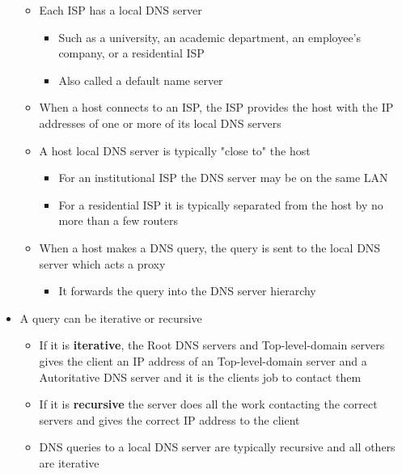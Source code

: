 \documentclass[11pt]{article}
\providecommand{\tightlist}{%
      \setlength{\itemsep}{0pt}\setlength{\parskip}{0pt}}
\begin{document}
\begin{itemize}
  \begin{itemize}
  \tightlist
  \item
    Each ISP has a local DNS server

    \begin{itemize}
    \tightlist
    \item
      Such as a university, an academic department, an employee's
      company, or a residential ISP
    \item
      Also called a default name server
    \end{itemize}
  \item
    When a host connects to an ISP, the ISP provides the host with the
    IP addresses of one or more of its local DNS servers
  \item
    A host local DNS server is typically "close to" the host

    \begin{itemize}
    \tightlist
    \item
      For an institutional ISP the DNS server may be on the same LAN
    \item
      For a residential ISP it is typically separated from the host by
      no more than a few routers
    \end{itemize}
  \item
    When a host makes a DNS query, the query is sent to the local DNS
    server which acts a proxy

    \begin{itemize}
    \tightlist
    \item
      It forwards the query into the DNS server hierarchy
    \end{itemize}
  \end{itemize}
\item
  A query can be iterative or recursive

  \begin{itemize}
  \tightlist
  \item
    If it is \textbf{iterative}, the Root DNS servers and
    Top-level-domain servers gives the client an IP address of an
    Top-level-domain server and a Autoritative DNS server and it is the
    clients job to contact them
  \item
    If it is \textbf{recursive} the server does all the work contacting
    the correct servers and gives the correct IP address to the client
  \item
    DNS queries to a local DNS server are typically recursive and all
    others are iterative
  \end{itemize}
\end{itemize}
\end{document}
